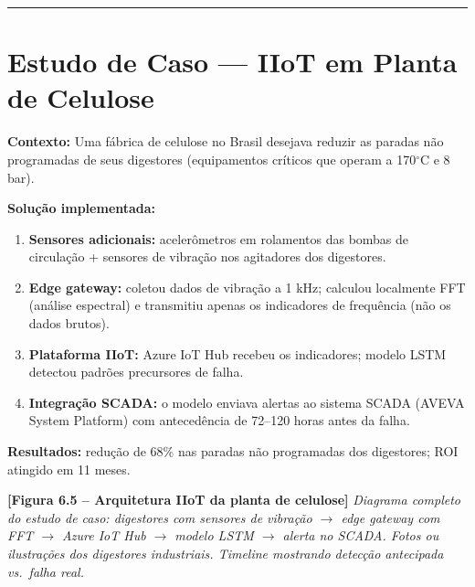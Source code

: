 \begin{center}\rule{0.5\linewidth}{0.5pt}\end{center}

\section{\texorpdfstring{Estudo de Caso --- IIoT em Planta de Celulose}{Estudo de Caso  IIoT em Planta de Celulose}}\label{estudo-de-caso-iiot-em-planta-de-celulose}

\textbf{Contexto:} Uma fábrica de celulose no Brasil desejava reduzir as paradas não programadas de seus digestores (equipamentos críticos que operam a 170\ensuremath{^\circ}C e 8 bar).

\textbf{Solução implementada:}

\begin{enumerate}
\def\labelenumi{\arabic{enumi}.}
\tightlist
\item
  \textbf{Sensores adicionais:} acelerômetros em rolamentos das bombas de circulação + sensores de vibração nos agitadores dos digestores.
\item
  \textbf{Edge gateway:} coletou dados de vibração a 1 kHz; calculou localmente FFT (análise espectral) e transmitiu apenas os indicadores de frequência (não os dados brutos).
\item
  \textbf{Plataforma IIoT:} Azure IoT Hub recebeu os indicadores; modelo LSTM detectou padrões precursores de falha.
\item
  \textbf{Integração SCADA:} o modelo enviava alertas ao sistema SCADA (AVEVA System Platform) com antecedência de 72--120 horas antes da falha.
\end{enumerate}

\textbf{Resultados:} redução de 68\% nas paradas não programadas dos digestores; ROI atingido em 11 meses.

\begin{caixafigura}

\textbf{{[}Figura 6.5 -- Arquitetura IIoT da planta de celulose{]}}
\emph{Diagrama completo do estudo de caso: digestores com sensores de vibração \ensuremath{\rightarrow} edge gateway com FFT \ensuremath{\rightarrow} Azure IoT Hub \ensuremath{\rightarrow} modelo LSTM \ensuremath{\rightarrow} alerta no SCADA. Fotos ou ilustrações dos digestores industriais. Timeline mostrando detecção antecipada vs.~falha real.}

\end{caixafigura}

